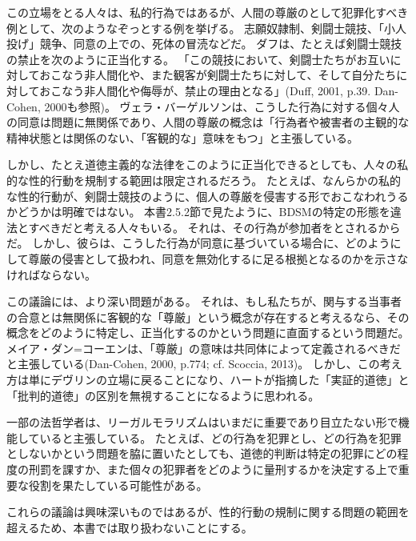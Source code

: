 \documentclass[paper=a4,book,openany]{jlreq} \usepackage{mystyle}
\begin{document}
この立場をとる人々は、私的行為ではあるが、人間の尊厳のとして犯罪化すべき例として、次のようなぞっとする例を挙げる。
志願奴隷制、剣闘士競技、「小人投げ」競争、同意の上での、死体の冒涜などだ。
ダフは、たとえば剣闘士競技の禁止を次のように正当化する。
「この競技において、剣闘士たちがお互いに対しておこなう非人間化や、また観客が剣闘士たちに対して、そして自分たちに対しておこなう非人間化や侮辱が、禁止の理由となる」(Duff, 2001, p.39. Dan-Cohen, 2000も参照)。
ヴェラ・バーゲルソンは、こうした行為に対する個々人の同意は問題に無関係であり、人間の尊厳の概念は「行為者や被害者の主観的な精神状態とは関係のない、「客観的な」意味をもつ」と主張している\citep[p.217]{bergelson07:_right_be_hurt}。

しかし、たとえ道徳主義的な法律をこのように正当化できるとしても、人々の私的な性的行動を規制する範囲は限定されるだろう。
たとえば、なんらかの私的な性的行動が、剣闘士競技のように、個人の尊厳を侵害する形でおこなわれうるかどうかは明確ではない。
本書2.5.2節で見たように、BDSMの特定の形態を違法とすべきだと考える人々もいる。
それは、その行為が参加者をとされるからだ。
しかし、彼らは、こうした行為が同意に基づいている場合に、どのようにして尊厳の侵害として扱われ、同意を無効化するに足る根拠となるのかを示さなければならない。

この議論には、より深い問題がある。
それは、もし私たちが、関与する当事者の合意とは無関係に客観的な「尊厳」という概念が存在すると考えるなら、その概念をどのように特定し、正当化するのかという問題に直面するという問題だ。
メイア・ダン=コーエンは、「尊厳」の意味は共同体によって定義されるべきだと主張している(Dan-Cohen, 2000, p.774; cf. Scoccia, 2013)。
\nocite{scoccia13:_in_defen_pure_legal_moral}\nocite{dan-cohen00:_basic_values_victim_state_mind}
しかし、この考え方は単にデヴリンの立場に戻ることになり、ハートが指摘した「実証的道徳」と「批判的道徳」の区別を無視することになるように思われる。

一部の法哲学者は、リーガルモラリズムはいまだに重要であり目立たない形で機能していると主張している。
たとえば、どの行為を犯罪とし、どの行為を犯罪としないかという問題を脇に置いたとしても、道徳的判断は特定の犯罪にどの程度の刑罰を課すか、また個々の犯罪者をどのように量刑するかを決定する上で重要な役割を果たしている可能性がある\citep[cf.][]{ristroph11:_third_wave_legal_moral}。

これらの議論は興味深いものではあるが、性的行動の規制に関する問題の範囲を超えるため、本書では取り扱わないことにする。
\end{document}
